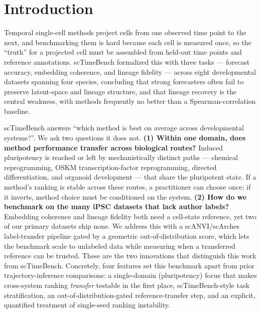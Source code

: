 \documentclass[11pt]{article}
\begin{document}
\section{Introduction}
Temporal single-cell methods project cells from one observed time point to the next,
and benchmarking them is hard because each cell is measured once, so the ``truth'' for
a projected cell must be assembled from held-out time points and reference
annotations. scTimeBench \citep{osakwe2026} formalized this with three tasks ---
forecast accuracy, embedding coherence, and lineage fidelity --- across eight
developmental datasets spanning four species, concluding that strong forecasters often
fail to preserve latent-space and lineage structure, and that lineage recovery is the
central weakness, with methods frequently no better than a Spearman-correlation
baseline.

scTimeBench answers ``which method is best on average across developmental systems?''.
We ask two questions it does not. \textbf{(1) Within one domain, does method
performance transfer across biological routes?} Induced pluripotency is reached or
left by mechanistically distinct paths --- chemical reprogramming, OSKM
transcription-factor reprogramming, directed differentiation, and organoid development
--- that share the pluripotent state. If a method's ranking is stable across these
routes, a practitioner can choose once; if it inverts, method choice must be
conditioned on the system. \textbf{(2) How do we benchmark on the many iPSC datasets
that lack author labels?} Embedding coherence and lineage fidelity both need a
cell-state reference, yet two of our primary datasets ship none. We address this with a
scANVI/scArches label-transfer pipeline gated by a geometric out-of-distribution
score, which lets the benchmark scale to unlabeled data while measuring when a
transferred reference can be trusted. These are the two innovations that distinguish
this work from scTimeBench. Concretely, four features set this benchmark apart from prior trajectory-inference comparisons: a single-domain (pluripotency) focus that makes cross-system ranking \emph{transfer} testable in the first place, scTimeBench-style task stratification, an out-of-distribution-gated reference-transfer step, and an explicit, quantified treatment of single-seed ranking instability.

\end{document}
